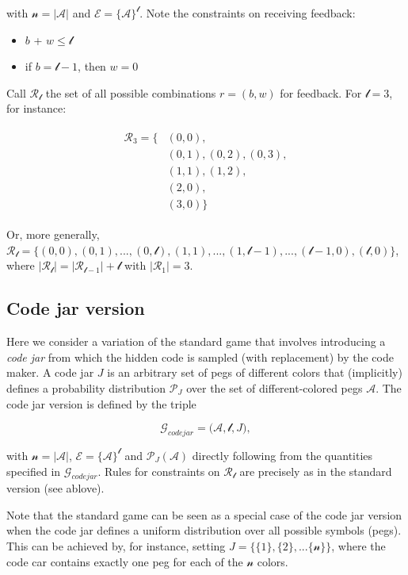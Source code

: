 \documentclass[12pt]{article}
\begin{document}
with $\mathcal{n} = |\mathcal{A}|$ and $\mathcal{E} = \{\mathcal{A}\}^\mathcal{l}$. Note the constraints on receiving feedback: 
\begin{itemize}
\item $b$ + $w \leq \mathcal{l}$
\item  if $b = \mathcal{l}-1$, then $w = 0$
\end{itemize}
Call $\mathcal{R_l}$ the set of all possible combinations $r=(b,w)$ for feedback. For $\mathcal{l} = 3$, for instance:

\begin{align*}
\begin{split}
\mathcal{R_3} = \{ &(0,0), \\
			 &(0,1), (0,2), (0,3), \\
			 &(1,1), (1,2), \\
			 &(2,0), \\
			 &(3,0) \}
\end{split}
\end{align*}

Or, more generally, $\mathcal{R_l} = \{ (0,0), (0,1), ..., (0,\mathcal{l}), (1,1), ..., (1,\mathcal{l}-1), ...,  (\mathcal{l}-1,0), (\mathcal{l},0) \}$, where $|\mathcal{R_l}| = |\mathcal{R_{l-1}}| + \mathcal{l}$ with $|\mathcal{R_1}| = 3$.


\subsection{Code jar version}

Here we consider a variation of the standard game that involves introducing a \textit{code jar} from which the hidden code is sampled (with replacement) by the code maker. A code jar $J$ is an arbitrary set of pegs of different colors that (implicitly) defines a probability distribution $\mathcal{P}_J$ over the set of different-colored pegs $\mathcal{A}$. The code jar version is defined by the triple

\[\mathcal{G}_{code jar}=\Big(\mathcal{A}, \mathcal{l}, {J}\Big),\]

with $\mathcal{n} = |\mathcal{A}|$, $\mathcal{E} = \{\mathcal{A}\}^\mathcal{l}$ and $\mathcal{P}_J(\mathcal{A})$ directly following from the quantities specified in $\mathcal{G}_{code jar}$. Rules for constraints on $\mathcal{R_l}$ are precisely as in the standard version (see ablove).

Note that the standard game can be seen as a special case of the code jar version when the code jar defines a uniform distribution over all possible symbols (pegs). This can be achieved by, for instance, setting ${J}=\{\{1\},\{2\},...\{\mathcal{n}\}\}$, where the code car contains exactly one peg for each of the $\mathcal{n}$ colors.
\end{document}
